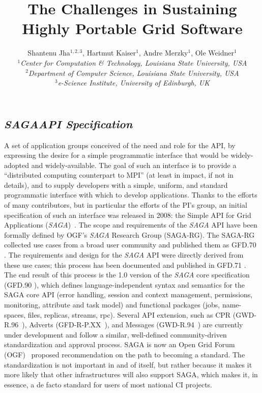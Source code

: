 \documentclass[a4paper,10pt]{article}
\newcommand{\BI}[1]{\textbf{\textit{#1}}}
\newcommand{\sagaspec}{\textit{SAGA}\xspace}
\newcommand{\spec}{\sagaspec}
\begin{document}
 \title{\large The Challenges in Sustaining Highly Portable Grid Software}
 
 \author{Shantenu Jha$^{1,2,3}$, Hartmut Kaiser$^{1}$, Andre Merzky$^{1}$, Ole Weidner$^{1}$ \\
   \small{\emph{$^{1}$Center for Computation \& Technology, Louisiana State University, USA}}\\
   \small{\emph{$^{2}$Department of Computer Science, Louisiana State University, USA}}\\
   \small{\emph{$^{3}$e-Science Institute, University of Edinburgh, UK}}
 }
 
 \maketitle
 

\subsection{\spec \BI{API Specification}}
A set of application groups conceived of the need and role for the
API, by expressing the desire for a simple programmatic interface that
would be widely-adopted and widely-available.  The goal of such an
interface is to provide a ``distributed computing counterpart to MPI''
(at least in impact, if not in details), and to supply developers with
a simple, uniform, and standard programmatic interface with which to
develop applications.  Thanks to the efforts of many contributors, but
in particular the efforts of the PI's group, an initial specification
of such an interface was released in 2008: the Simple API for Grid
Applications (\spec)~\cite{ogf-gfd-90}. The scope and requirements of
the \spec API have been formally defined by OGF's \spec Research Group
(SAGA-RG).  The SAGA-RG collected use cases from a broad user
community and published them as GFD.70 \cite{ogf-gfd-70}. The
requirements and design for the \spec API were directly derived from
these use cases; this process has been documented and published in
GFD.71 \cite{ogf-gfd-71}. The end result of this process is the 1.0
version of the \spec core specification (GFD.90 \cite{ogf-gfd-90}),
which defines language-independent syntax and semantics for the SAGA
core API (error handling, session and context management, permissions,
monitoring, attribute and task model) and functional packages (jobs,
name-spaces, files, replicas, streams, rpc). Several API extension,
such as CPR (GWD-R.96~\cite{ogf-gwd-r-96}), Adverts
(GFD-R-P.XX~\cite{ogf-gwd-r-p-xx}), and Messages
(GWD-R.94~\cite{ogf-gwd-r-94}) are currently under development and
follow a similar, well-defined community-driven standardization and
approval process. SAGA is now an Open Grid Forum (OGF)~\cite{ogf}
proposed recommendation on the path to becoming a standard.  The
standardization is not important in and of itself, but rather because
it makes it more likely that other infrastructures will also support
SAGA, which makes it, in essence, a de facto standard for users of
most national CI projects.
\end{document}
